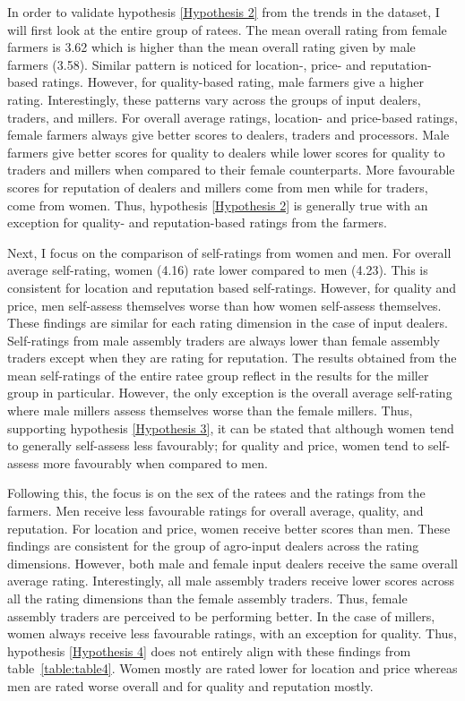 \documentclass[12pt,english]{article}\usepackage[]{graphicx}\usepackage[]{color}
\begin{document}
\begin{onehalfspace}
In order to validate hypothesis \ref{Hypothesis 2} from the trends
in the dataset, I will first look at the entire group of ratees. The
mean overall rating from female farmers is 3.62
which is higher than the mean overall rating given by male farmers
(3.58).
Similar pattern is noticed for location-, price- and reputation-based
ratings. However, for quality-based rating, male farmers give a higher
rating. Interestingly, these patterns vary across the groups of input
dealers, traders, and millers. For overall average ratings, location-
and price-based ratings, female farmers always give better scores
to dealers, traders and processors. Male farmers give better scores
for quality to dealers while lower scores for quality to traders and
millers when compared to their female counterparts. More favourable
scores for reputation of dealers and millers come from men while for
traders, come from women. Thus, hypothesis \ref{Hypothesis 2} is
generally true with an exception for quality- and reputation-based
ratings from the farmers. 
\end{onehalfspace}

Next, I focus on the comparison of self-ratings from women and men.
For overall average self-rating, women (4.16)
rate lower compared to men (4.23).
This is consistent for location and reputation based self-ratings.
However, for quality and price, men self-assess themselves worse than
how women self-assess themselves. These findings are similar for each
rating dimension in the case of input dealers. Self-ratings from male
assembly traders are always lower than female assembly traders except
when they are rating for reputation. The results obtained from the
mean self-ratings of the entire ratee group reflect in the results
for the miller group in particular. However, the only exception is
the overall average self-rating where male millers assess themselves
worse than the female millers. Thus, supporting hypothesis \ref{Hypothesis 3},
it can be stated that although women tend to generally self-assess
less favourably; for quality and price, women tend to self-assess
more favourably when compared to men.

Following this, the focus is on the sex of the ratees and the ratings
from the farmers. Men receive less favourable ratings for overall
average, quality, and reputation. For location and price, women receive
better scores than men. These findings are consistent for the group
of agro-input dealers across the rating dimensions. However, both
male and female input dealers receive the same overall average rating.
Interestingly, all male assembly traders receive lower scores across
all the rating dimensions than the female assembly traders. Thus,
female assembly traders are perceived to be performing better. In
the case of millers, women always receive less favourable ratings,
with an exception for quality. Thus, hypothesis \ref{Hypothesis 4}
does not entirely align with these findings from table~\ref{table:table4}.
Women mostly are rated lower for location and price whereas men are
rated worse overall and for quality and reputation mostly. 
\end{document}
